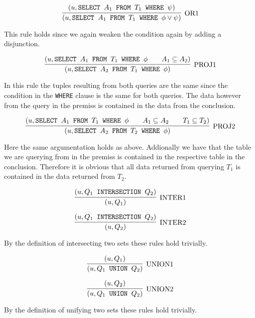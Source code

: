{\[
\infer[\text{OR1}]
	{(u,\text{\texttt{SELECT $A_1$ FROM $T_1$ WHERE $\phi \lor \psi$}})}
	{(u,\text{\texttt{SELECT $A_1$ FROM $T_1$ WHERE $\psi$}})}
\]

This rule holds since we again weaken the condition again by adding a disjunction.

\[
\infer[\text{PROJ1}]
	{(u,\text{\texttt{SELECT $A_2$ FROM $T_1$ WHERE $\phi$}})}
	{(u,\text{\texttt{SELECT $A_1$ FROM $T_1$ WHERE $\phi$}} \qquad A_1 \subseteq A_2)}
\]

In this rule the tuples resulting from both queries are the same since the condition in the \texttt{WHERE} clause is the same for both queries. The data however from the query in the premiss is contained in the data from the conclusion.




\[
\infer[\text{PROJ2}]
	{(u,\text{\texttt{SELECT $A_2$ FROM $T_2$ WHERE $\phi$}})}
	{(u,\text{\texttt{SELECT $A_1$ FROM $T_1$ WHERE $\phi$}} \qquad A_1 \subseteq A_2 \qquad T_1 \subseteq T_2)}
\]

Here the same argumentation holds as above. Addionally we have that the table we are querying from in the premiss is contained in the respective table in the conclusion. Therefore it is obvious that all data returned from querying $T_1$ is contained in the data returned from $T_2$.


\[
\infer[\text{INTER1}]
	{(u,Q_1)}
	{(u,Q_1 \text{\texttt{ INTERSECTION }} Q_2)}
\]

\[
\infer[\text{INTER2}]
	{(u,Q_2)}
	{(u,Q_1 \text{\texttt{ INTERSECTION }} Q_2)}
\]

By the definition of intersecting two sets these rules hold trivially.

\[
\infer[\text{UNION1}]
	{(u,Q_1 \text{\texttt{ UNION }} Q_2)}
	{(u,Q_1)}
\]

\[
\infer[\text{UNION2}]
	{(u,Q_1 \text{\texttt{ UNION }} Q_2)}
	{(u,Q_2)}
\]

By the definition of unifying two sets these rules hold trivially.

}
